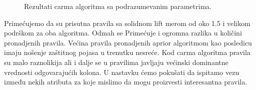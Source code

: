\documentclass[a4paper,10pt]{article}
\begin{document}
\begin{figure}[h!]
 \centering
 \caption{Rezultati carma algoritma sa podrazumevanim parametrima.}
\end{figure}

Primećujemo da su prisutna pravila sa solidnom lift merom od oko 1.5 i velikom podrškom za oba algoritma. Odmah se Primećuje
i ogromna razlika u količini pronadjenih pravila. Većina pravila pronadjenih aprior algoritmom kao posledicu imaju nošenje
zaštitnog pojasa u trenutku nesreće. Kod carma algoritma pravila su malo raznolikija ali i dalje se u pravilima javljaju 
većinski dominantne vrednosti odgovarajućih kolona. U nastavku ćemo pokušati da ispitamo vezu između nekih atributa za koje
mislimo da mogu proizvesti interesantna pravila.
\end{document}
